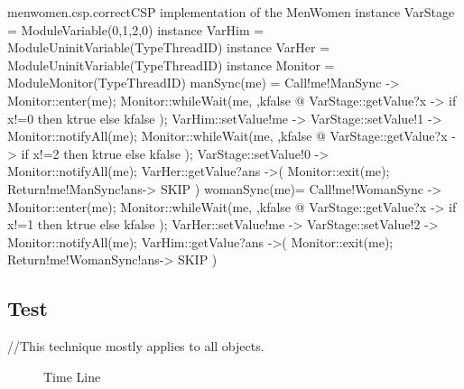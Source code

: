 \documentclass{article}
\begin{document}
\begin{cspfloat}{menwomen.csp.correct}{CSP implementation of the MenWomen}
instance VarStage = ModuleVariable({0,1,2},0) 
instance VarHim = ModuleUninitVariable(TypeThreadID)
instance VarHer = ModuleUninitVariable(TypeThreadID)
instance Monitor = ModuleMonitor(TypeThreadID)
manSync(me) = 
  Call!me!ManSync ->
  Monitor::enter(me);
    Monitor::whileWait(me, \ktrue,kfalse @
      VarStage::getValue?x ->
      if x!=0 then ktrue else kfalse
    );
    VarHim::setValue!me ->
    VarStage::setValue!1 ->
    Monitor::notifyAll(me);
    Monitor::whileWait(me, \ktrue,kfalse @
      VarStage::getValue?x ->
      if x!=2 then ktrue else kfalse
    );
    VarStage::setValue!0 ->
    Monitor::notifyAll(me);
    VarHer::getValue?ans ->(
  Monitor::exit(me);
  Return!me!ManSync!ans->
  SKIP
  )
womanSync(me)=
  Call!me!WomanSync ->
  Monitor::enter(me);
    Monitor::whileWait(me, \ktrue,kfalse @
      VarStage::getValue?x ->
      if x!=1 then ktrue else kfalse
    );
    VarHer::setValue!me ->
    VarStage::setValue!2 ->
    Monitor::notifyAll(me);
    VarHim::getValue?ans ->(
  Monitor::exit(me);
  Return!me!WomanSync!ans->
  SKIP
  )
\end{cspfloat}


\subsection{Test}
//This technique mostly applies to all objects.

\begin{figure}
  \centering
  \label{menwomen.timeline}
  \caption{Time Line}
\end{figure}
\end{document}
